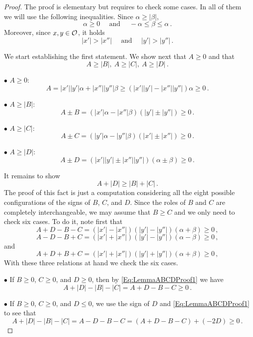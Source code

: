 \begin{proof} The proof is elementary but requires to check some cases. In all of them we will use the following inequalities. Since $\alpha \geq |\beta |$,
$$
\alpha\geq 0 \quad \textrm{ and } \quad  -\alpha \leq \beta \leq \alpha\,.
$$
Moreover, since $x,y\in\mathcal{O}$, it holds
$$
|x'|>|x''| \quad \textrm{ and } \quad |y'|>|y''|\,.
$$


We start establishing the first statement. We show next that $A\geq 0$ and that
$$
A \geq |B|, \ A \geq |C| ,\ A \geq |D|\,.
$$


$\bullet$ $A \geq 0$:
$$
 A =  |x'||y'|  \alpha + |x''||y''|\beta \geq (|x'||y'|  - |x''||y''|)\alpha \geq 0\,.
$$

$\bullet$ $A \geq |B|$:
$$
A\pm B = (|x'|\alpha-|x''|\beta)(|y'|\pm |y''|) \geq 0\,.
$$

$\bullet$ $A \geq |C|$:
$$
A\pm C = (|y'|\alpha-|y''|\beta)(|x'|\pm |x''|)  \geq 0\,.
$$

$\bullet$ $A \geq |D|$:
$$
A\pm D = (|x'||y'| \pm |x''||y''|)(\alpha \pm \beta) \geq 0\,.
$$


It remains to show
$$
A + |D| \geq |B| + |C|\,.
$$
The proof of this fact is just a computation considering all the eight possible configurations of the signs of $B$, $C$, and $D$. Since the roles of $B$ and $C$ are completely interchangeable, we may assume that $B \geq C$ and we only need to check six cases. To do it, note first that
\begin{equation}
\label{Eq:LemmaABCDProof1}
A + D - B - C = (|x'|-|x''|)(|y'|-|y''|)(\alpha + \beta) \geq 0 \,,
\end{equation}
\begin{equation}
\label{Eq:LemmaABCDProof2}
A - D - B + C = (|x'|+|x''|)(|y'|-|y''|)(\alpha - \beta) \geq 0 \,,
\end{equation}
and
\begin{equation}
\label{Eq:LemmaABCDProof3}
A + D + B + C = (|x'|+|x''|)(|y'|+|y''|)(\alpha + \beta) \geq 0 \,,
\end{equation}
With these three relations at hand we check the six cases.

$\bullet$ If $B \geq 0$, $C \geq 0$, and $D \geq 0$, then by \eqref{Eq:LemmaABCDProof1} we have
$$
A + |D| - |B| - |C| = A + D - B - C \geq 0\,.
$$

$\bullet$ If $B \geq 0$, $C \geq 0$, and $D \leq 0$, we use the sign of $D$ and \eqref{Eq:LemmaABCDProof1} to see that
$$
A + |D| - |B| - |C| = A - D - B - C =  (A + D - B - C) + (-2D) \geq 0\,.
$$


\end{proof}
